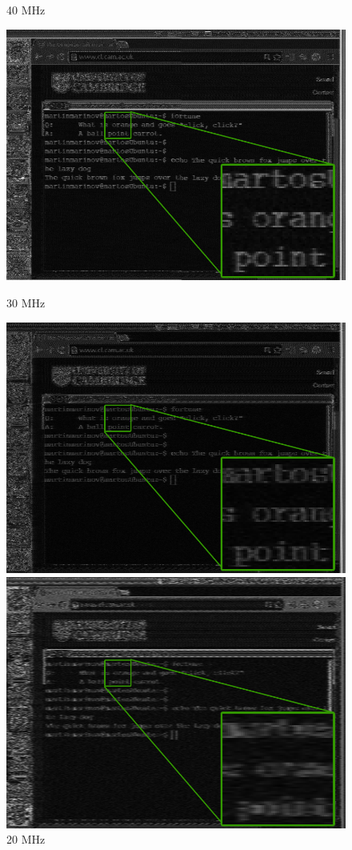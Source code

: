 \documentclass[a4paper,12pt,twoside,openright]{report}
\begin{document}
\begin{figure}[h!]
  \caption{40 MHz}
\endminipage\hfill
{}
  \centering
    \includegraphics[width=\linewidth]{sr_30MHz_at_190MHz}
  \caption{30 MHz}
\endminipage\hfill
{}
  \centering
    \includegraphics[width=\linewidth]{sr_20MHz_at_190MHz}
  \caption{20 MHz}
\endminipage\hfill
{}
  \centering
    \includegraphics[width=\linewidth]{sr_10MHz_at_190MHz}

\end{figure}
\end{document}
